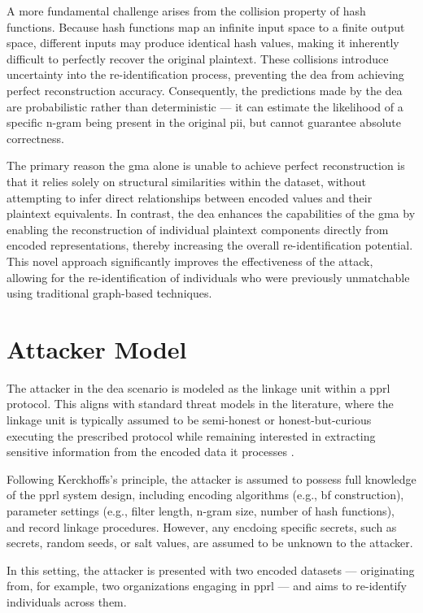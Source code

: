 A more fundamental challenge arises from the collision property of hash functions.
Because hash functions map an infinite input space to a finite output space, different inputs may produce identical hash values, making it inherently difficult to perfectly recover the original plaintext.
These collisions introduce uncertainty into the re-identification process, preventing the \ac{dea} from achieving perfect reconstruction accuracy.
Consequently, the predictions made by the \ac{dea} are probabilistic rather than deterministic — it can estimate the likelihood of a specific n-gram being present in the original \ac{pii}, but cannot guarantee absolute correctness.

The primary reason the \ac{gma} alone is unable to achieve perfect reconstruction is that it relies solely on structural similarities within the dataset, without attempting to infer direct relationships between encoded values and their plaintext equivalents.
In contrast, the \ac{dea} enhances the capabilities of the \ac{gma} by enabling the reconstruction of individual plaintext components directly from encoded representations, thereby increasing the overall re-identification potential.
This novel approach significantly improves the effectiveness of the attack, allowing for the re-identification of individuals who were previously unmatchable using traditional graph-based techniques.


\section{Attacker Model}

The attacker in the \ac{dea} scenario is modeled as the linkage unit within a \ac{pprl} protocol.
This aligns with standard threat models in the literature, where the linkage unit is typically assumed to be semi-honest or honest-but-curious executing the prescribed protocol while remaining interested in extracting sensitive information from the encoded data it processes \cite{schaefer2024}.

Following Kerckhoffs’s principle, the attacker is assumed to possess full knowledge of the \ac{pprl} system design, including encoding algorithms (e.g., \ac{bf} construction), parameter settings (e.g., filter length, n-gram size, number of hash functions), and record linkage procedures.
However, any encdoing specific secrets, such as secrets, random seeds, or salt values, are assumed to be unknown to the attacker.

In this setting, the attacker is presented with two encoded datasets — originating from, for example, two organizations engaging in \ac{pprl} — and aims to re-identify individuals across them.

